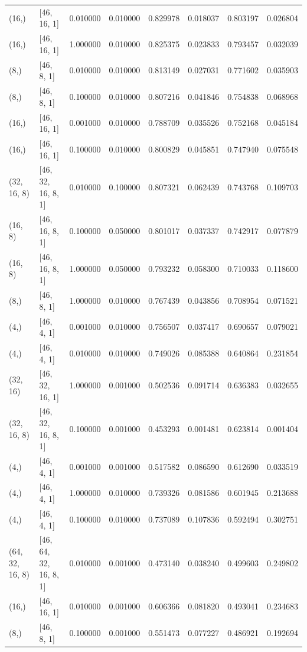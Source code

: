\begin{tabular}{llrrrrrr}
(16,) & [46, 16, 1] & 0.010000 & 0.010000 & 0.829978 & 0.018037 & 0.803197 & 0.026804 \\
(16,) & [46, 16, 1] & 1.000000 & 0.010000 & 0.825375 & 0.023833 & 0.793457 & 0.032039 \\
(8,) & [46, 8, 1] & 0.010000 & 0.010000 & 0.813149 & 0.027031 & 0.771602 & 0.035903 \\
(8,) & [46, 8, 1] & 0.100000 & 0.010000 & 0.807216 & 0.041846 & 0.754838 & 0.068968 \\
(16,) & [46, 16, 1] & 0.001000 & 0.010000 & 0.788709 & 0.035526 & 0.752168 & 0.045184 \\
(16,) & [46, 16, 1] & 0.100000 & 0.010000 & 0.800829 & 0.045851 & 0.747940 & 0.075548 \\
(32, 16, 8) & [46, 32, 16, 8, 1] & 0.010000 & 0.100000 & 0.807321 & 0.062439 & 0.743768 & 0.109703 \\
(16, 8) & [46, 16, 8, 1] & 0.100000 & 0.050000 & 0.801017 & 0.037337 & 0.742917 & 0.077879 \\
(16, 8) & [46, 16, 8, 1] & 1.000000 & 0.050000 & 0.793232 & 0.058300 & 0.710033 & 0.118600 \\
(8,) & [46, 8, 1] & 1.000000 & 0.010000 & 0.767439 & 0.043856 & 0.708954 & 0.071521 \\
(4,) & [46, 4, 1] & 0.001000 & 0.010000 & 0.756507 & 0.037417 & 0.690657 & 0.079021 \\
(4,) & [46, 4, 1] & 0.010000 & 0.010000 & 0.749026 & 0.085388 & 0.640864 & 0.231854 \\
(32, 16) & [46, 32, 16, 1] & 1.000000 & 0.001000 & 0.502536 & 0.091714 & 0.636383 & 0.032655 \\
(32, 16, 8) & [46, 32, 16, 8, 1] & 0.100000 & 0.001000 & 0.453293 & 0.001481 & 0.623814 & 0.001404 \\
(4,) & [46, 4, 1] & 0.001000 & 0.001000 & 0.517582 & 0.086590 & 0.612690 & 0.033519 \\
(4,) & [46, 4, 1] & 1.000000 & 0.010000 & 0.739326 & 0.081586 & 0.601945 & 0.213688 \\
(4,) & [46, 4, 1] & 0.100000 & 0.010000 & 0.737089 & 0.107836 & 0.592494 & 0.302751 \\
(64, 32, 16, 8) & [46, 64, 32, 16, 8, 1] & 0.010000 & 0.001000 & 0.473140 & 0.038240 & 0.499603 & 0.249802 \\
(16,) & [46, 16, 1] & 0.010000 & 0.001000 & 0.606366 & 0.081820 & 0.493041 & 0.234683 \\
(8,) & [46, 8, 1] & 0.100000 & 0.001000 & 0.551473 & 0.077227 & 0.486921 & 0.192694 \\

\end{tabular}
